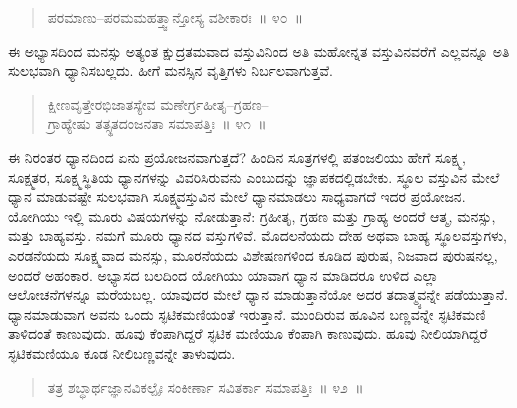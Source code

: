 \vspace{-0.25cm}

\begin{verse}
ಪರಮಾಣು–ಪರಮಮಹತ್ತ್ವಾನ್ತೋಸ್ಯ ವಶೀಕಾರಃ~॥ ೪೦~॥
\end{verse}

\vspace{-0.3cm}


ಈ ಅಭ್ಯಾಸದಿಂದ ಮನಸ್ಸು ಅತ್ಯಂತ ಕ್ಷುದ್ರತಮವಾದ ವಸ್ತುವಿನಿಂದ ಅತಿ ಮಹೋನ್ನತ ವಸ್ತುವಿನವರೆಗೆ ಎಲ್ಲವನ್ನೂ ಅತಿ ಸುಲಭವಾಗಿ ಧ್ಯಾನಿಸಬಲ್ಲದು. ಹೀಗೆ ಮನಸ್ಸಿನ ವೃತ್ತಿಗಳು ನಿರ್ಬಲವಾಗುತ್ತವೆ. 

\vspace{-0.3cm}

\begin{verse}
ಕ್ಷೀಣವೃತ್ತೇರಭಿಜಾತಸ್ಯೇವ ಮಣೇರ್ಗ್ರಹೀತೃ–ಗ್ರಹಣ–\\ಗ್ರಾಹ್ಯೇಷು ತತ್ಸ್ಥತದಂಜನತಾ ಸಮಾಪತ್ತಿಃ~॥ ೪೧~॥
\end{verse}

\vspace{-0.3cm}


ಈ ನಿರಂತರ ಧ್ಯಾನದಿಂದ ಏನು ಪ್ರಯೋಜನವಾಗುತ್ತದೆ? ಹಿಂದಿನ ಸೂತ್ರಗಳಲ್ಲಿ ಪತಂಜಲಿಯು ಹೇಗೆ ಸೂಕ್ಷ್ಮ, ಸೂಕ್ಷ್ಮತರ, ಸೂಕ್ಷ್ಮಸ್ಥಿತಿಯ ಧ್ಯಾನಗಳನ್ನು ವಿವರಿಸಿರುವನು ಎಂಬುದನ್ನು ಜ್ಞಾಪಕದಲ್ಲಿಡಬೇಕು. ಸ್ಥೂಲ ವಸ್ತುವಿನ ಮೇಲೆ ಧ್ಯಾನ ಮಾಡುವಷ್ಟೇ ಸುಲಭವಾಗಿ ಸೂಕ್ಷ್ಮವಸ್ತುವಿನ ಮೇಲೆ ಧ್ಯಾನಮಾಡಲು ಸಾಧ್ಯವಾಗದೆ ಇದರ ಪ್ರಯೋಜನ. ಯೋಗಿಯು ಇಲ್ಲಿ ಮೂರು ವಿಷಯಗಳನ್ನು ನೋಡುತ್ತಾನೆ: ಗ್ರಹೀತೃ, ಗ್ರಹಣ ಮತ್ತು ಗ್ರಾಹ್ಯ ಅಂದರೆ ಆತ್ಮ, ಮನಸ್ಸು, ಮತ್ತು ಬಾಹ್ಯವಸ್ತು. ನಮಗೆ ಮೂರು ಧ್ಯಾನದ ವಸ್ತುಗಳಿವೆ. ಮೊದಲನೆಯದು ದೇಹ ಅಥವಾ ಬಾಹ್ಯ ಸ್ಥೂಲವಸ್ತುಗಳು, ಎರಡನೆಯದು ಸೂಕ್ಷ್ಮವಾದ ಮನಸ್ಸು, ಮೂರನೆಯದು ವಿಶೇಷಣಗಳಿಂದ ಕೂಡಿದ ಪುರುಷ, ನಿಜವಾದ ಪುರುಷನಲ್ಲ, ಅಂದರೆ ಅಹಂಕಾರ. ಅಭ್ಯಾಸದ ಬಲದಿಂದ ಯೋಗಿಯು ಯಾವಾಗ ಧ್ಯಾನ ಮಾಡಿದರೂ ಉಳಿದ ಎಲ್ಲಾ ಆಲೋಚನೆಗಳನ್ನೂ ಮರೆಯಬಲ್ಲ. ಯಾವುದರ ಮೇಲೆ ಧ್ಯಾನ ಮಾಡುತ್ತಾನೆಯೋ ಅದರ ತದಾತ್ಮ್ಯವನ್ನೇ ಪಡೆಯುತ್ತಾನೆ. ಧ್ಯಾನಮಾಡುವಾಗ ಅವನು ಒಂದು ಸ್ಫಟಿಕಮಣಿಯಂತೆ ಇರುತ್ತಾನೆ. ಮುಂದಿರುವ ಹೂವಿನ ಬಣ್ಣವನ್ನೇ ಸ್ಫಟಿಕಮಣಿ ತಾಳಿದಂತೆ ಕಾಣುವುದು. ಹೂವು ಕೆಂಪಾಗಿದ್ದರೆ ಸ್ಫಟಿಕ ಮಣಿಯೂ ಕೆಂಪಾಗಿ ಕಾಣುವುದು. ಹೂವು ನೀಲಿಯಾಗಿದ್ದರೆ ಸ್ಫಟಿಕಮಣಿಯೂ ಕೂಡ ನೀಲಿಬಣ್ಣವನ್ನೇ ತಾಳುವುದು. 

\vspace{-0.3cm}

\begin{verse}
ತತ್ರ ಶಬ್ಧಾರ್ಥಜ್ಞಾನವಿಕಲ್ಪೈಃ ಸಂಕೀರ್ಣಾ ಸವಿತರ್ಕಾ ಸಮಾಪತ್ತಿಃ~॥ ೪೨~॥
\end{verse}

